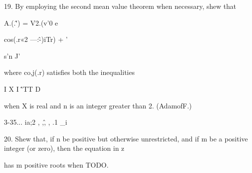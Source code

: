 19. By employing the second mean value theorem when necessary, shew that 



A.(.\^') = V2.(v'0 e 



cos(.r«2 —:\^-)iTr) + ' 



s'n J' 



where co,j(.r) satisfies both the inequalities 

I X I \^'TT D 

when X is real and n is an integer greater than 2. (AdamofF.) 



3-35... ia;2 , ,\^, , .1 \_i 



20. Shew that, if n be positive but otherwise unrestricted, and if m be a positive 
integer (or zero), then the equation in z 

has m positive roots when TODO.
